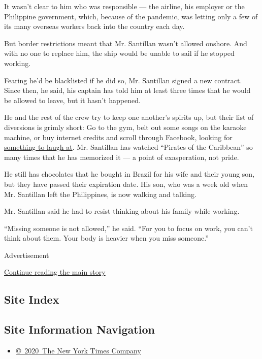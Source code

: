 It wasn't clear to him who was responsible --- the airline, his employer
or the Philippine government, which, because of the pandemic, was
letting only a few of its many overseas workers back into the country
each day.

But border restrictions meant that Mr. Santillan wasn't allowed onshore.
And with no one to replace him, the ship would be unable to sail if he
stopped working.

Fearing he'd be blacklisted if he did so, Mr. Santillan signed a new
contract. Since then, he said, his captain has told him at least three
times that he would be allowed to leave, but it hasn't happened.

He and the rest of the crew try to keep one another's spirits up, but
their list of diversions is grimly short: Go to the gym, belt out some
songs on the karaoke machine, or buy internet credits and scroll through
Facebook, looking for
\href{https://www.facebookcorewwwi.onion/watch/?v=274567883836011}{something
to laugh at}. Mr. Santillan has watched ``Pirates of the Caribbean'' so
many times that he has memorized it --- a point of exasperation, not
pride.

He still has chocolates that he bought in Brazil for his wife and their
young son, but they have passed their expiration date. His son, who was
a week old when Mr. Santillan left the Philippines, is now walking and
talking.

Mr. Santillan said he had to resist thinking about his family while
working.

``Missing someone is not allowed,'' he said. ``For you to focus on work,
you can't think about them. Your body is heavier when you miss
someone.''

Advertisement

\protect\hyperlink{after-bottom}{Continue reading the main story}

\hypertarget{site-index}{%
\subsection{Site Index}\label{site-index}}

\hypertarget{site-information-navigation}{%
\subsection{Site Information
Navigation}\label{site-information-navigation}}

\begin{itemize}
\tightlist
\item
  \href{https://help.nytimes3xbfgragh.onion/hc/en-us/articles/115014792127-Copyright-notice}{©~2020~The
  New York Times Company}
\end{itemize}


